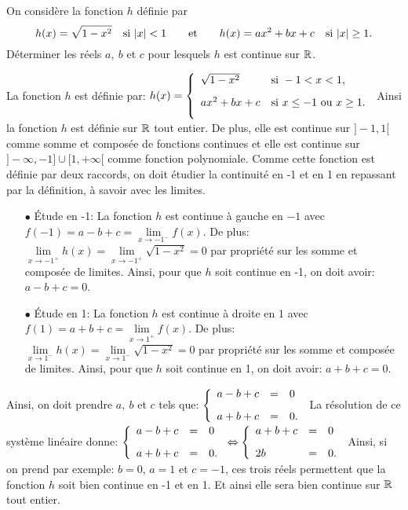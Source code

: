 \documentclass[a4paper, 11pt,reqno]{article}
\begin{document}
\begin{exercice}  \;
	On consid\`ere la fonction $h$ d\'efinie par
	$$h(x)=\sqrt{1-x^2}\quad \hbox{si}\ |x|<1\qquad \hbox{et}\qquad h(x)=ax^2+bx+c\quad \hbox{si}\ |x|\geq 1.$$
	D\'eterminer les r\'eels $a,\ b$ et $c$ pour lesquels $h$ est continue sur $\mathbb{R}$.
\end{exercice}
\begin{correction}  \;
	La fonction $h$ est d\'efinie par: $h(x)=\left\lbrace \begin{array}{ll} \sqrt{1-x^2}& \hbox{si}\ -1<x<1,\vsec\\ ax^2+bx+c & \hbox{si}\ x\leq -1\ \hbox{ou}\  x\geq 1.\vsec \end{array}\right.$ Ainsi la fonction $h$ est d\'efinie sur $\mathbb{R}$ tout entier. De plus, elle est continue sur $\rbrack -1,1\lbrack$ comme somme et compos\'ee de fonctions continues et elle est continue sur $\rbrack -\infty,-1\rbrack\cup\lbrack 1,+\infty\lbrack$ comme fonction polynomiale. Comme cette fonction est d\'efinie par deux raccords, on doit \'etudier la continuit\'e en -1 et en 1 en repassant par la d\'efinition, \`{a} savoir avec les limites.
	\begin{itemize}
		\item[$\bullet$] \'Etude en -1: La fonction $h$ est continue \`{a} gauche en $-1$ avec $f(-1)=a-b+c=\lim\limits_{x\to -1^-} f(x)$. De plus: $\lim\limits_{x\to -1^+} h(x)=\lim\limits_{x\to -1^+}\sqrt{1-x^2}=0$ par propri\'et\'e sur les somme et compos\'ee de limites. Ainsi, pour que $h$ soit continue en -1, on doit avoir: $a-b+c=0$.
		\item[$\bullet$] \'Etude en 1: La fonction $h$ est continue \`{a} droite en $1$ avec $f(1)=a+b+c=\lim\limits_{x\to 1^+} f(x)$. De plus: $\lim\limits_{x\to 1^-} h(x)=\lim\limits_{x\to 1^-}\sqrt{1-x^2}=0$ par propri\'et\'e sur les somme et compos\'ee de limites. Ainsi, pour que $h$ soit continue en 1, on doit avoir: $a+b+c=0$.
	\end{itemize}
	Ainsi, on doit prendre $a,\ b$ et $c$ tels que: $\left\lbrace \begin{array}{lll} a-b+c&=&0\vsec\\ a+b+c&=&0.  \end{array}\right.$ La r\'esolution de ce syst\`{e}me lin\'eaire donne: $\left\lbrace \begin{array}{lll} a-b+c&=&0\vsec\\ a+b+c&=&0.  \end{array}\right.\Leftrightarrow \left\lbrace \begin{array}{lll}  a+b+c&=&0\vsec\\ 2b&=&0.  \end{array}\right.$ Ainsi, si on prend par exemple: $b=0$, $a=1$ et $c=-1$, ces trois r\'eels permettent que la fonction $h$ soit bien continue en -1 et en 1. Et ainsi elle sera bien continue sur $\mathbb{R}$ tout entier.
\end{correction}
\end{document}
